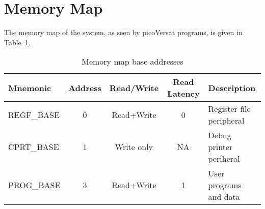 \section{Memory Map}
\label{sec:mem_map}

The memory map of the system, as seen by picoVersat programs, is given in
Table~\ref{tab:memmap}.

\begin{table}[!htbp]
  \centering
    \begin{tabular}{|p{3cm}|c|c|c|p{4cm}|}
    \hline 
    {\bf Mnemonic} & {\bf Address} & {\bf Read/Write} & {\bf Read Latency} & {\bf Description} \\
    \hline \hline 
     REGF\_BASE & 0 & Read+Write & 0 & Register file peripheral \\
    \hline
     CPRT\_BASE & 1 & Write only & NA & Debug printer periheral \\
    \hline
     PROG\_BASE & 3 & Read+Write &  1 & User programs and data\\
    \hline
 
    \end{tabular}
  \caption{Memory map base addresses}
  \label{tab:memmap}
\end{table}


